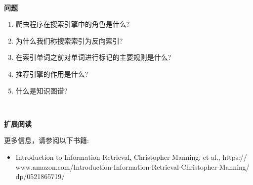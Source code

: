 \noindent\textbf{}\ \par
\textbf{问题} \ \par
\begin{enumerate}
	\item 爬虫程序在搜索引擎中的角色是什么?
	\item 为什么我们称搜索索引为反向索引?
	\item 在索引单词之前对单词进行标记的主要规则是什么?
	\item 推荐引擎的作用是什么?
	\item 什么是知识图谱?
\end{enumerate}

\noindent\textbf{}\ \par
\textbf{扩展阅读} \ \par
更多信息，请参阅以下书籍: \par
\begin{itemize}
	\item Introduction to Information Retrieval, Christopher Manning, et al.,  https:/​/​www.​amazon.​com/Introduction-​Information-​Retrieval-​Christopher-​Manning/​dp/​0521865719/​
\end{itemize}

\newpage

































